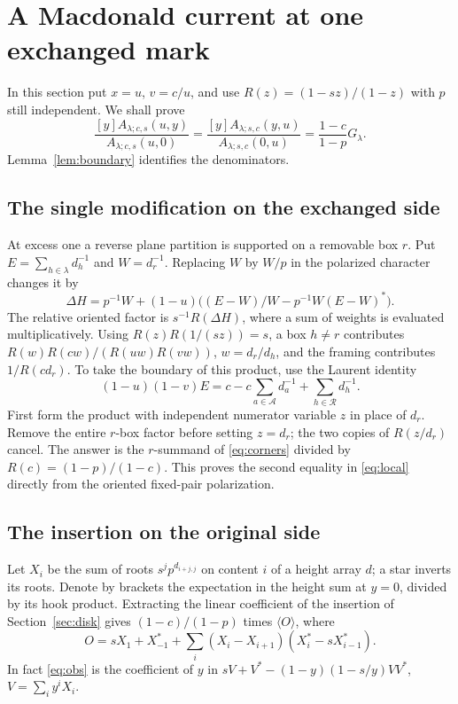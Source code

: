 \section{A Macdonald current at one exchanged mark}\label{sec:currents}
In this section put $x=u$, $v=c/u$, and use $R(z)=(1-sz)/(1-z)$
with $p$ still independent. We shall prove
\begin{equation}\label{eq:local}
 \frac{[y]A_{\lambda;c,s}(u,y)}{A_{\lambda;c,s}(u,0)}
 =\frac{[y]A_{\lambda;s,c}(y,u)}{A_{\lambda;s,c}(0,u)}
 =\frac{1-c}{1-p}G_\lambda .
\end{equation}
Lemma~\ref{lem:boundary} identifies the denominators.
\subsection{The single modification on the exchanged side}


At excess one a reverse plane partition is supported on a removable box \(r\). Put \(E=\sum_{h\in\lambda}d_h^{-1}\) and \(W=d_r^{-1}\). Replacing \(W\) by \(W/p\) in the polarized character changes it by
\[
 \Delta H=p^{-1}W+(1-u)\big((E-W)/W-p^{-1}W(E-W)^*\big).
\]
The relative oriented factor is \(s^{-1}R(\Delta H)\), where a sum of weights is evaluated multiplicatively. Using \(R(z)R(1/(sz))=s\), a box \(h\ne r\) contributes \(R(w)R(cw)/(R(uw)R(vw))\), \(w=d_r/d_h\), and the framing contributes \(1/R(c d_r)\). To take the boundary of this product, use the Laurent identity
\[
 (1-u)(1-v)E=c-c\sum_{a\in\mathcal{A}}d_a^{-1}
                       +\sum_{h\in\mathcal{R}}d_h^{-1}.
\]
First form the product with independent numerator variable \(z\) in place of \(d_r\). Remove the entire \(r\)-box factor before setting \(z=d_r\); the two copies of \(R(z/d_r)\) cancel. The answer is the \(r\)-summand of \eqref{eq:corners} divided by \(R(c)=(1-p)/(1-c)\). This proves the second equality in \eqref{eq:local} directly from the oriented fixed-pair polarization.

\subsection{The insertion on the original side}

Let \(X_i\) be the sum of roots \(s^j p^{d_{i+j,j}}\) on content \(i\) of a height array \(d\); a star inverts its roots. Denote by brackets the expectation in the height sum at \(y=0\), divided by its hook product. Extracting the linear coefficient of the insertion of Section~\ref{sec:disk} gives \((1-c)/(1-p)\) times \(\langle O\rangle\), where
\begin{equation}
O=sX_1+X_{-1}^*
     +\sum_i (X_i-X_{i+1})(X_i^*-sX_{i-1}^*).
 \label{eq:obs}
\end{equation}
In fact \eqref{eq:obs} is the coefficient of \(y\) in \(sV+V^*-(1-y)(1-s/y)VV^*\), \(V=\sum_i y^i X_i\).

